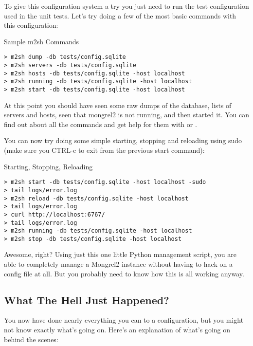 To give this configuration system a try you just need to run the test configuration used
in the unit tests.  Let's try doing a few of the most basic commands with this configuration:

\begin{code}{Sample m2sh Commands}
\begin{lstlisting}
> m2sh dump -db tests/config.sqlite
> m2sh servers -db tests/config.sqlite
> m2sh hosts -db tests/config.sqlite -host localhost
> m2sh running -db tests/config.sqlite -host localhost
> m2sh start -db tests/config.sqlite -host localhost
\end{lstlisting}
\end{code}

At this point you should have seen some raw dumps of the database, lists of servers and hosts,
seen that mongrel2 is not running, and then started it.  You can find out about all the commands
and get help for them with  or .

You can now try doing some simple starting, stopping and reloading using sudo (make sure you CTRL-c
to exit from the previous start command):

\begin{code}{Starting, Stopping, Reloading}
\begin{lstlisting}
> m2sh start -db tests/config.sqlite -host localhost -sudo
> tail logs/error.log
> m2sh reload -db tests/config.sqlite -host localhost
> tail logs/error.log
> curl http://localhost:6767/
> tail logs/error.log
> m2sh running -db tests/config.sqlite -host localhost
> m2sh stop -db tests/config.sqlite -host localhost
\end{lstlisting}
\end{code}

Awesome, right?  Using just this one little Python management script, you
are able to completely manage a Mongrel2 instance without having to hack
on a config file at all.  But you probably need to know how this is all
working anyway.


\subsection{What The Hell Just Happened?}

You now have done nearly everything you can to a configuration, but you might not know exactly
what's going on.  Here's an explanation of what's going on behind the scenes:

